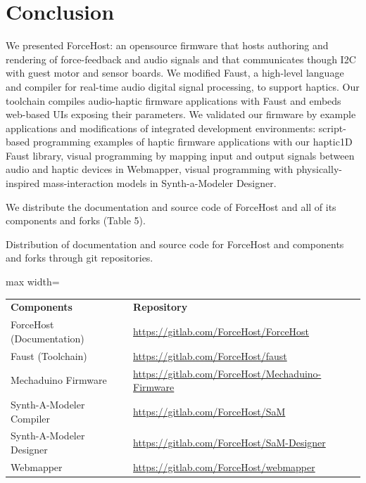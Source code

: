 \documentclass[sigconf]{nimeart}
\begin{document}
\section{Conclusion}\label{conclusion}

We presented ForceHost: an opensource firmware that hosts authoring and rendering of force-feedback and audio signals and that communicates though I2C with guest motor and sensor boards. We modified Faust, a high-level language and compiler for real-time audio digital signal processing, to support haptics. Our toolchain compiles audio-haptic firmware applications with Faust and embeds web-based UIs exposing their parameters. We validated our firmware by example applications and modifications of integrated development environments: script-based programming examples of haptic firmware applications with our haptic1D Faust library, visual programming by mapping input and output signals between audio and haptic devices in Webmapper, visual programming with physically-inspired mass-interaction models in Synth-a-Modeler Designer.

We distribute the documentation and source code of ForceHost and all of its components and forks (Table 5).

Distribution of documentation and source code for ForceHost and components and forks through git repositories.

\begin{table}[htbp]\centering\small
\begin{adjustbox}{max width=\textwidth}\begin{tabular}{ll}
\toprule
\midrule
\textbf{Components} & \textbf{Repository} \\
ForceHost (Documentation) & \url{https://gitlab.com/ForceHost/ForceHost} \\
Faust (Toolchain) & \url{https://gitlab.com/ForceHost/faust} \\
Mechaduino Firmware & \url{https://gitlab.com/ForceHost/Mechaduino-Firmware} \\
Synth-A-Modeler Compiler & \url{https://gitlab.com/ForceHost/SaM} \\
Synth-A-Modeler Designer & \url{https://gitlab.com/ForceHost/SaM-Designer} \\
Webmapper & \url{https://gitlab.com/ForceHost/webmapper} \\
\bottomrule
\end{tabular}\end{adjustbox}\end{table}
\end{document}
